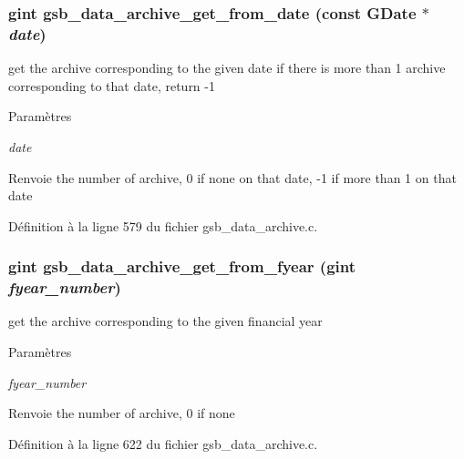 \subsubsection[{gsb\_\-data\_\-archive\_\-get\_\-from\_\-date}]{\setlength{\rightskip}{0pt plus 5cm}gint gsb\_\-data\_\-archive\_\-get\_\-from\_\-date (const GDate $\ast$ {\em date})}\label{gsb__data__archive_8c_ad4fa84d9de6ee591fbe1d3e3bf42e22f}
get the archive corresponding to the given date if there is more than 1 archive corresponding to that date, return -\/1


\begin{DoxyParams}{Paramètres}
\item[{\em date}]\end{DoxyParams}
\begin{DoxyReturn}{Renvoie}
the number of archive, 0 if none on that date, -\/1 if more than 1 on that date 
\end{DoxyReturn}


Définition à la ligne 579 du fichier gsb\_\-data\_\-archive.c.

\subsubsection[{gsb\_\-data\_\-archive\_\-get\_\-from\_\-fyear}]{\setlength{\rightskip}{0pt plus 5cm}gint gsb\_\-data\_\-archive\_\-get\_\-from\_\-fyear (gint {\em fyear\_\-number})}\label{gsb__data__archive_8c_a75a79145c15deb4977a71e7c5ee6db47}
get the archive corresponding to the given financial year


\begin{DoxyParams}{Paramètres}
\item[{\em fyear\_\-number}]\end{DoxyParams}
\begin{DoxyReturn}{Renvoie}
the number of archive, 0 if none 
\end{DoxyReturn}


Définition à la ligne 622 du fichier gsb\_\-data\_\-archive.c.

